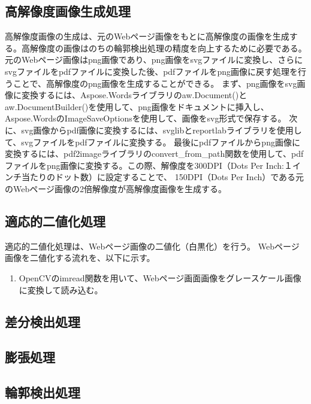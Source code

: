 \subsection{高解像度画像生成処理}\label{subsec:Generate_high_images}
高解像度画像の生成は、元のWebページ画像をもとに高解像度の画像を生成する。高解像度の画像はのちの輪郭検出処理の精度を向上するために必要である。
元のWebページ画像はpng画像であり、png画像をsvgファイルに変換し、さらにsvgファイルをpdfファイルに変換した後、pdfファイルをpng画像に戻す処理を行うことで、高解像度のpng画像を生成することができる。
まず、png画像をsvg画像に変換するには、Aspose.Wordsライブラリのaw.Document()とaw.DocumentBuilder()を使用して、png画像をドキュメントに挿入し、Aspose.WordsのImageSaveOptionsを使用して、画像をsvg形式で保存する。
次に、svg画像からpdf画像に変換するには、svglibとreportlabライブラリを使用して、svgファイルをpdfファイルに変換する。
最後にpdfファイルからpng画像に変換するには、pdf2imageライブラリのconvert\_from\_path関数を使用して、pdfファイルをpng画像に変換する。この際、解像度を300DPI（Dots Per Inch:１インチ当たりのドット数）に設定することで、
150DPI（Dots Per Inch）である元のWebページ画像の2倍解像度が高解像度画像を生成する。


\subsection{適応的二値化処理}\label{subsec:Adaptive_Binarisation}
適応的二値化処理は、Webページ画像の二値化（白黒化）を行う。
Webページ画像を二値化する流れを、以下に示す。
\begin{enumerate}
    \item OpenCVのimread関数を用いて、Webページ画面画像をグレースケール画像に変換して読み込む。
\end{enumerate}


\subsection{差分検出処理}\label{subsec:difference_detection_process}


\subsection{膨張処理}\label{subsec:dilation}


\subsection{輪郭検出処理}\label{subsec:contour_detection_processing}


